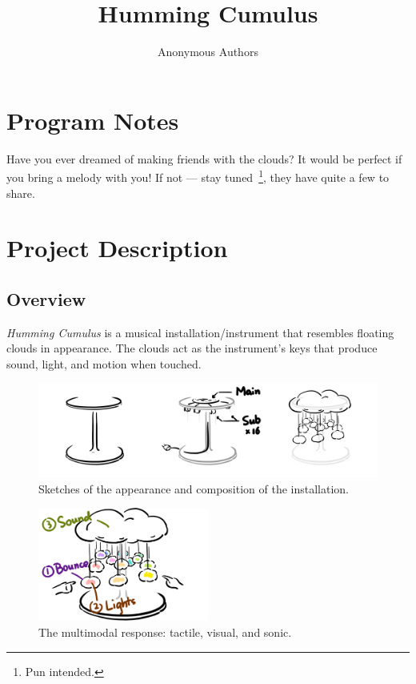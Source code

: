 \documentclass{nimemusic}
\begin{document}
\newcommand{\CuHum}{\textit{Humming Cumulus}}
\title{Humming Cumulus}

\author{Anonymous Authors}

\renewcommand{\shortauthors}{Authors, et al.}


\maketitle


\section{Program Notes}
Have you ever dreamed of making friends with the clouds? It would be perfect if you bring a melody with you! If not --- stay tuned~\footnote{Pun intended.}, they have quite a few to share.

\section{Project Description}
\subsection{Overview}
\CuHum{} is a musical installation/instrument that resembles floating clouds in appearance. The clouds act as the instrument's keys that produce sound, light, and motion when touched.

\begin{figure}[h!]
  \includegraphics[width=1\textwidth]{Sketches.png}
  \caption{Sketches of the appearance and composition of the installation.}
  \label{fig:Sketches}
\end{figure}

\begin{figure}[h!]
  \includegraphics[width=0.5\textwidth]{Response.png}
  \caption{The multimodal response: tactile, visual, and sonic.}
  \label{fig:Response}
\end{figure}
\end{document}
